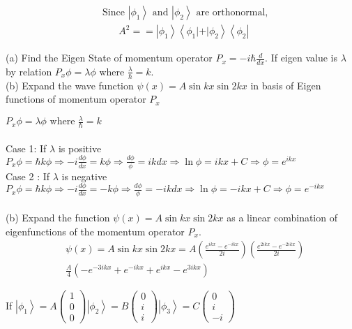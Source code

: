 \begin{enumerate}
\begin{answer}
\begin{align*}
	&\text { Since }\left|\phi_{1}\right\rangle \text { and }\left|\phi_{2}\right\rangle \text { are orthonormal, } \\
	&\qquad A^{2}==\left|\phi_{1}\right\rangle\left\langle\phi_{1}|+| \phi_{2}\right\rangle\left\langle\phi_{2}\right|
\end{align*}	
\end{answer}
	\begin{minipage}{\textwidth}
	\item (a) Find the Eigen State of momentum operator $P_{x}=-i \hbar \frac{d}{d x}$. If eigen value is $\lambda$ by relation $P_{x} \phi=\lambda \phi$ where $\frac{\lambda}{\hbar}=k$.\\
	(b) Expand the wave function $\psi(x)=A \sin k x \sin 2 k x$ in basis of Eigen functions of momentum operator $P_{x}$
\end{minipage}
\begin{answer}
	$P_{x} \phi=\lambda \phi \text { where } \frac{\lambda}{\hbar}=k$\\\\
	Case 1: If $\lambda$ is positive $P_{x} \phi=\hbar k \phi \Rightarrow-i \frac{d \phi}{d x}=k \phi \Rightarrow \frac{d \phi}{\phi}=i k d x \Rightarrow \ln \phi=i k x+C \Rightarrow \phi=e^{i k x}$\\
	Case 2 : If $\lambda$ is negative\\
	$P_{x} \phi=\hbar k \phi \Rightarrow-i \frac{d \phi}{d x}=-k \phi \Rightarrow \frac{d \phi}{\phi}=-i k d x \Rightarrow \ln \phi=-i k x+C \Rightarrow \phi=e^{-i k x}$\\\\
	(b) Expand the function $\psi(x)=A \sin k x \sin 2 k x$ as a linear combination of eigenfunctions of the momentum operator $P_{x}$.
	\begin{align*}
	&\psi(x)=A \sin k x \sin 2 k x=A\left(\frac{e^{i k x}-e^{-i k x}}{2 i}\right)\left(\frac{e^{2 i k x}-e^{-2 i k x}}{2 i}\right) \\
	&\frac{A}{4}\left(-e^{-3 i k x}+e^{-i k x}+e^{i k x}-e^{3 i k x}\right)
	\end{align*}
\end{answer}
	\begin{minipage}{\textwidth}
	\item If $\left|\phi_{1}\right\rangle=A\left(\begin{array}{l}1 \\ 0 \\ 0\end{array}\right)\left|\phi_{2}\right\rangle=B\left(\begin{array}{l}0 \\ i \\ i\end{array}\right)\left|\phi_{3}\right\rangle=C\left(\begin{array}{c}0 \\ i \\ -i\end{array}\right)$\\

\end{minipage}
\end{enumerate}
